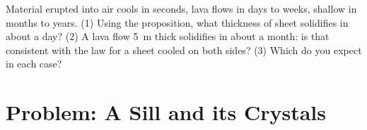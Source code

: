 \begin{exercise}[$\star\star\star$]\label{exo:g11:igneous-rocks:15}
Material erupted into air cools in seconds, lava flows in days to weeks,
shallow  in months to years. (1) Using the proposition, what
thickness of sheet solidifies in about a day? (2) A lava flow \qty{5}{m}
thick solidifies in about a month: is that consistent with the law for a
sheet cooled on both sides? (3) Which  do you expect in each case?
\end{exercise}

\section{Problem: A Sill and its Crystals}

